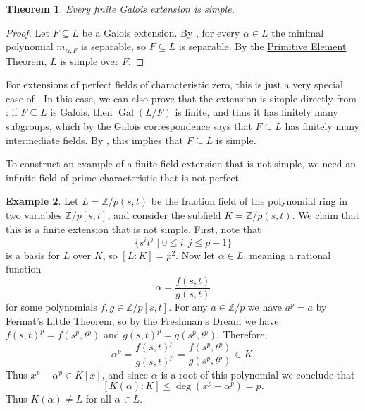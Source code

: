 \documentclass[12pt]{report}
\newtheorem{theorem}{Theorem}[chapter]
\numberwithin{equation}{section}
\numberwithin{theorem}{chapter}
\theoremstyle{definition}
\newtheorem{example}[theorem]{Example}
\newtheorem*{basic properties}{Basic Properties}
\newtheorem*{Important Remark}{Important Remark}
\DeclareMathOperator{\Gal}{Gal}
\begin{document}
\begin{theorem}
	Every finite Galois extension is simple.
\end{theorem}


\begin{proof}
	Let $F \subseteq L$ be a Galois extension. By , for every $\alpha \in L$ the minimal polynomial $m_{\alpha,F}$ is separable, so $F \subseteq L$ is separable. By the \hyperref[primitive element theorem]{Primitive Element Theorem}, $L$ is simple over $F$.
\end{proof}

For extensions of perfect fields of characteristic zero, this is just a very special case of . In this case, we can also prove that the extension is simple directly from : if $F \subseteq L$ is Galois, then $\Gal(L/F)$ is finite, and thus it has finitely many subgroups, which by the \hyperref[Fundamental Theorem of Galois Theory]{Galois correspondence} says that $F \subseteq L$ has finitely many intermediate fields. By , this implies that $F \subseteq L$ is simple.


To construct an example of a finite field extension that is not simple, we need an infinite field of prime characteristic that is not perfect.


\begin{example}
	Let $L = \mathbb{Z}/p(s,t)$ be the fraction field of the polynomial ring in two variables $\mathbb{Z}/p[s,t]$, and consider the subfield $K = \mathbb{Z}/p(s,t)$. We claim that this is a finite extension that is not simple. First, note that
	$$\lbrace s^i t^j \mid 0 \leqslant i, j \leqslant p-1 \rbrace$$
	is a basis for $L$ over $K$, so $[L : K] = p^2$.
	Now let $\alpha \in L$, meaning a rational function 
	$$\alpha = \frac{f(s,t)}{g(s,t)}$$
	for some polynomials $f, g \in \mathbb{Z}/p[s,t]$. For any $a \in \mathbb{Z}/p$ we have $a^p=a$ by Fermat's Little Theorem, so by the \hyperref[freshmans dream]{Freshman's Dream} we have $f(s,t)^p = f(s^p,t^p)$ and $g(s,t)^p = g(s^p,t^p)$. Therefore,
	$$\alpha^p = \frac{f(s,t)^p}{g(s,t)^p} = \frac{f(s^p,t^p)}{g(s^p,t^p)} \in K.$$
	Thus $x^p-\alpha^p \in K[x]$, and since $\alpha$ is a root of this polynomial we conclude that
	$$[K(\alpha) : K] \leqslant \deg(x^p-\alpha^p) = p.$$	
	Thus $K(\alpha) \neq L$ for all $\alpha \in L$.
\end{example}
\end{document}
